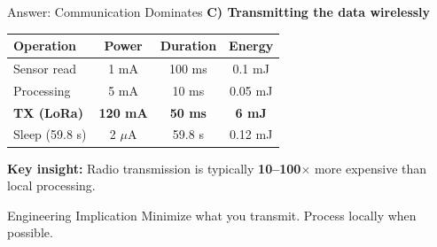 \documentclass[aspectratio=169,11pt]{beamer}
\begin{document}
\begin{frame}{Answer: Communication Dominates}
    \textbf{C) Transmitting the data wirelessly}
    
    \vspace{0.3cm}
    \begin{table}
        \centering
        \begin{tabular}{@{}lccc@{}}
            \toprule
            \textbf{Operation} & \textbf{Power} & \textbf{Duration} & \textbf{Energy} \\
            \midrule
            Sensor read & 1 mA & 100 ms & 0.1 mJ \\
            Processing & 5 mA & 10 ms & 0.05 mJ \\
            \textbf{TX (LoRa)} & \textbf{120 mA} & \textbf{50 ms} & \textbf{6 mJ} \\
            Sleep (59.8 s) & 2 $\mu$A & 59.8 s & 0.12 mJ \\
            \bottomrule
        \end{tabular}
    \end{table}
    
    \vspace{0.3cm}
    \textbf{Key insight:} Radio transmission is typically \textbf{10--100$\times$} more expensive than local processing.
    
    \vspace{0.2cm}
    \begin{alertblock}{Engineering Implication}
        Minimize what you transmit. Process locally when possible.
    \end{alertblock}
\end{frame}
\end{document}
